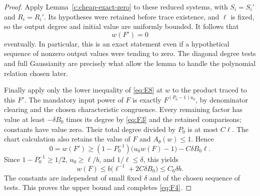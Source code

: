 \begin{proof}
Apply Lemma~\ref{c:cheap-exact-zero} to these reduced systems,
with $S_i=S_i'$ and $R_i=R_i'$.  Its hypotheses were retained
before trace existence, and $\ell$ is fixed, so the output degree
and initial value are uniformly bounded.  It follows that
\[
                              w(F')=0
\]
eventually.  In particular, this is an exact statement even if a
hypothetical sequence of nonzero output values were tending to zero.
The diagonal degree tests and full Gaussianity are precisely what
allow the lemma to handle the polynomial relation chosen later.

Finally apply only the lower inequality of \eqref{eq:E8} at $w$
to the product traced to this $F'$.  The mandatory input power of
$F$ is exactly $F^{(P_0-1)u_0}$, by denominator clearing and the
chosen characteristic congruence.  Every remaining factor has
value at least $-\delta B_0$ times its degree by \eqref{eq:F3}
and the retained comparisons; constants have value zero.  Their
total degree divided by $P_0$ is at most $C\ell$.  The chart
calculation also retains the value of $F$ and
$A_\theta(w)\le1$.  Hence
\[
 0=w(F')\ge(1-P_0^{-1})\bigl(u_0w(F)-1\bigr)
                                      -C\delta B_0\ell.
\]
Since $1-P_0^{-1}\ge1/2$, $u_0\ge\ell/b$, and
$1/\ell\le\delta$, this yields
\[
            w(F)\le b\bigl(\ell^{-1}+2C\delta B_0\bigr)
                        \le C_6\delta b.
\]
The constants are independent of small fixed $\delta$ and of the
chosen sequence of tests.  This proves the upper bound and
completes \eqref{eq:F4}.
\end{proof}
